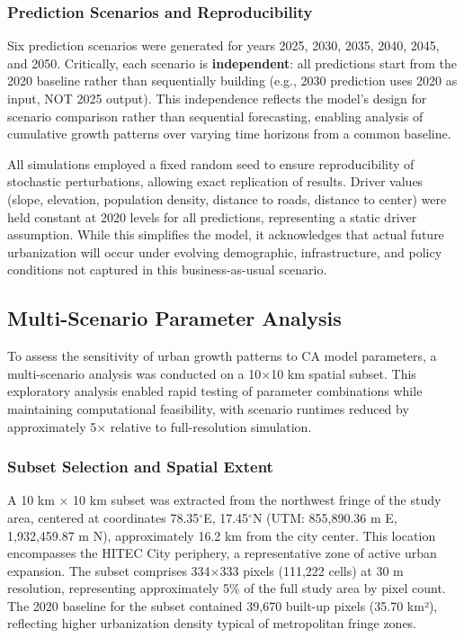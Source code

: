 \documentclass[12pt,a4paper]{article}
\begin{document}
\subsubsection{Prediction Scenarios and Reproducibility}

Six prediction scenarios were generated for years 2025, 2030, 2035, 2040, 2045, and 2050. Critically, each scenario is \textbf{independent}: all predictions start from the 2020 baseline rather than sequentially building (e.g., 2030 prediction uses 2020 as input, NOT 2025 output). This independence reflects the model's design for scenario comparison rather than sequential forecasting, enabling analysis of cumulative growth patterns over varying time horizons from a common baseline.

All simulations employed a fixed random seed to ensure reproducibility of stochastic perturbations, allowing exact replication of results. Driver values (slope, elevation, population density, distance to roads, distance to center) were held constant at 2020 levels for all predictions, representing a static driver assumption. While this simplifies the model, it acknowledges that actual future urbanization will occur under evolving demographic, infrastructure, and policy conditions not captured in this business-as-usual scenario.

\subsection{Multi-Scenario Parameter Analysis}

To assess the sensitivity of urban growth patterns to CA model parameters, a multi-scenario analysis was conducted on a 10$\times$10 km spatial subset. This exploratory analysis enabled rapid testing of parameter combinations while maintaining computational feasibility, with scenario runtimes reduced by approximately 5$\times$ relative to full-resolution simulation.

\subsubsection{Subset Selection and Spatial Extent}

A 10 km $\times$ 10 km subset was extracted from the northwest fringe of the study area, centered at coordinates 78.35$^\circ$E, 17.45$^\circ$N (UTM: 855,890.36 m E, 1,932,459.87 m N), approximately 16.2 km from the city center. This location encompasses the HITEC City periphery, a representative zone of active urban expansion. The subset comprises 334$\times$333 pixels (111,222 cells) at 30 m resolution, representing approximately 5\% of the full study area by pixel count. The 2020 baseline for the subset contained 39,670 built-up pixels (35.70 km²), reflecting higher urbanization density typical of metropolitan fringe zones.
\end{document}
